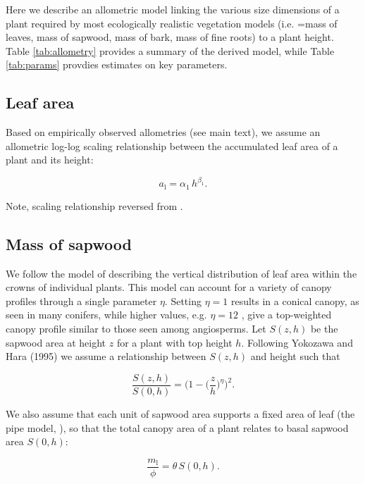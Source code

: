 \documentclass[12pt, a4paper]{article}
\begin{document}
\begin{appendices}
Here we describe an allometric model linking the various size dimensions
of a plant required by most ecologically realistic vegetation models
(i.e. =mass of leaves, mass of sapwood, mass of bark, mass of fine
roots) to a plant height. Table \ref{tab:allometry} provides a summary
of the derived model, while Table \ref{tab:params} provdies estimates on
key parameters.


\subsection{Leaf area}\label{leaf-area}

Based on empirically observed allometries (see main text), we assume an
allometric log-log scaling relationship between the accumulated leaf
area of a plant and its height:

\begin{equation}\label{eq:ha}
a_\textrm{l}=\alpha_1 \, h^{\beta_1}.
\end{equation}

Note, scaling relationship reversed from \citep{falster-2011}.

\subsection{Mass of sapwood}\label{mass-of-sapwood}

We follow the model of \citep{yokozawa-1995} describing the
vertical distribution of leaf area within the crowns of individual
plants. This model can account for a variety of canopy profiles through
a single parameter $\eta$. Setting $\eta=1$ results in a conical
canopy, as seen in many conifers, while higher values, e.g. $\eta=12$
, give a top-weighted canopy profile similar to those seen among
angiosperms. Let $S(z,h)$ be the sapwood area at height $z$ for a
plant with top height $h$. Following Yokozawa and Hara (1995) we
assume a relationship between $S(z,h)$ and height such that

\begin{equation}\label{eq:crown1}
\frac{S(z,h)}{S(0,h)}= \big(1-\big(\frac{z}{h}\big)^\eta\big)^2.
\end{equation}

We also assume that each unit of sapwood area supports a fixed area of
leaf (the pipe model, \citep{shinozaki-1964}), so that the total
canopy area of a plant relates to basal sapwood area $S(0,h)$:

\begin{equation}\label{eq:crown2}
\frac{m_\textrm{l}}{\phi}= \theta \, S(0,h).
\end{equation}


\end{appendices}
\end{document}
